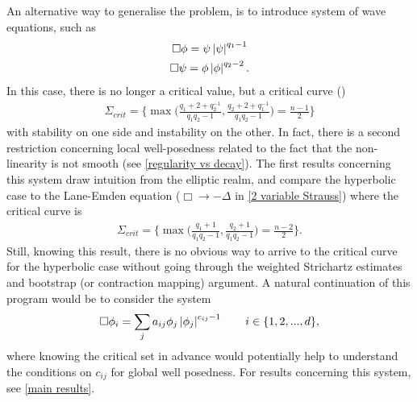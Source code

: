 \documentclass[11pt, oneside]{amsart}
\begin{document}
	An alternative way to generalise the problem, is to introduce system of wave equations, such as 
	\begin{equation}\label{2 variable Strauss}
		\begin{gathered}
			\Box\phi=\psi\left\lvert \psi\right\rvert^{q_1-1}\\
			\Box\psi=\phi\left\lvert \phi\right\rvert^{q_2-2}.
		\end{gathered}
	\end{equation}
	In this case, there is no longer a critical value, but a critical curve (\cite{del_santo_global_1997})
	\begin{equation}\label{2 variable Strauss curve}
		\begin{gathered}
			\Sigma_{crit}=\bigg\{\max\Big(\frac{q_1+2+q_2^{-1}}{q_1q_2-1},\frac{q_2+2+q_1^{-1}}{q_1q_2-1}\Big)=\frac{n-1}{2}\bigg\}
		\end{gathered}
	\end{equation}
	with stability on one side and instability on the other. In fact, there is a second restriction concerning local well-posedness related to the fact that the non-linearity is not smooth (see \cref{regularity vs decay}). The first results concerning this system draw intuition from the elliptic realm, and compare the hyperbolic case to the Lane-Emden equation ($\Box\to-\Delta$ in \eqref{2 variable Strauss}) where the critical curve is
	\begin{equation*}
		\begin{gathered}
			\Sigma_{crit}=\bigg\{\max\Big(\frac{q_1+1}{q_1q_2-1},\frac{q_2+1}{q_1q_2-1}\Big)=\frac{n-2}{2}\bigg\}.
		\end{gathered}
	\end{equation*} 
	Still, knowing this result, there is no obvious way to arrive to the critical curve for the hyperbolic case without going through the weighted Strichartz estimates and bootstrap (or contraction mapping) argument. A natural continuation of this program would be to consider the system
	\begin{equation}\label{n variable Strauss}
		\begin{gathered}
			\Box \phi_i=\sum_{j}a_{ij}\phi_j\left\lvert \phi_j\right\rvert^{c_{ij}-1}\qquad i\in\{1,2,...,d\},
		\end{gathered}
	\end{equation}
	where knowing the critical set in advance would potentially help to understand the conditions on $c_{ij}$ for global well posedness. For results concerning this system, see \cref{main results}.
	
\end{document}
